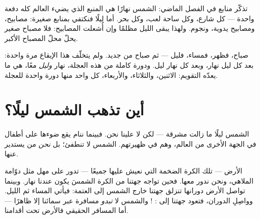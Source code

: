 \begin{remark}\label{rem:g1:day-and-night:lamp}
تذكّر منابع  في الفصل الماضي: الشمس نهارًا هي المنبع الذي
يضيء العالم كله دفعة واحدة --- كل شارع، وكل ساحة لعب، وكل بحر. أما
ليلًا فنكتفي بمنابع صغيرة: مصابيح، ومصابيح يدوية، ونجوم. ولهذا
يبقى الليل مظلمًا وإن أُشعلت المصابيح: فلا مصباح صغير يحلّ محلّ
المصباح الأكبر.
\end{remark}

\begin{example}\label{ex:g1:day-and-night:rhythm}
صباح، فظهر، فمساء، فليل --- ثم صباح من جديد. ولم يتخلّف هذا
الإيقاع مرة واحدة: بعد كل ليل نهار، وبعد كل نهار ليل. ودورة كاملة
من هذه العجلة، نهار \emph{وليل} معًا، هي ما يعدّه التقويم:
الاثنين، والثلاثاء، والأربعاء، كل واحد منها دورة واحدة للعجلة.
\end{example}

\section{أين تذهب الشمس ليلًا؟}

الشمس ليلًا ما زالت مشرقة --- لكن لا علينا نحن. فبينما ننام يقع
ضوءها على أطفال في الجهة الأخرى من العالم، وهم في ظهيرتهم. الشمس
لا تنطفئ؛ بل \emph{نحن} من يستدير عنها.

\begin{example}\label{ex:g1:day-and-night:spinning}
الأرض --- تلك الكرة الضخمة التي نعيش عليها جميعًا --- تدور على مهل
مثل دوّامة الملاهي، ونحن ندور معها. فحين تواجه جهتنا من الكرة
الشمسَ يكون عندنا نهار. وبينما تواصل الأرض دورانها تنزلق جهتنا
خارج  الشمس إلى العتمة: فيأتي المساء ثم الليل. وواصِلِ الدوران،
فتعود جهتنا إلى : ! والشمس لا \emph{تبدو} مسافرة عبر
سمائنا إلا ظاهرًا --- أما المسافر الحقيقي فالأرض تحت أقدامنا.
\end{example}

